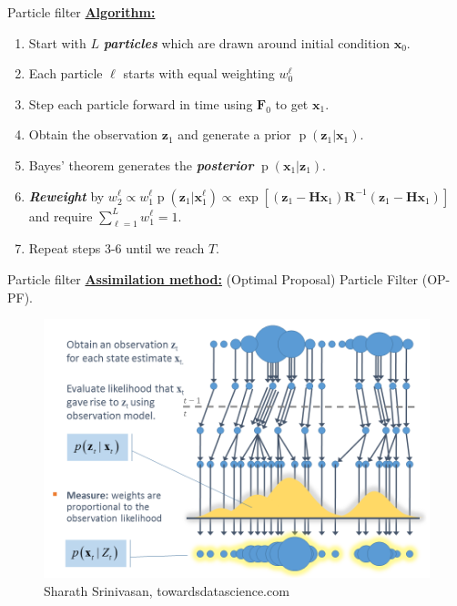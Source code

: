 \documentclass[aspectratio=169]{beamer}
\newcommand\boldgreen[1]{\textcolor{lighter_csu_green}{\emph{\textbf{#1}}}}
\newcommand{\state}{\boldsymbol{x}}
\newcommand{\observation}{\boldsymbol{z}}
\newcommand{\obsop}{\boldsymbol{H}}
\newcommand{\observationcovariance}{\boldsymbol{R}}
\newcommand{\modelf}{\boldsymbol{F}}
\newcommand{\prob}{\operatorname{p}}
\begin{document}

\begin{frame}{Particle filter}
\vfill
\textbf{\underline{Algorithm:}}
    \begin{enumerate}[1.]
    \pause
        \item Start with $L$ \boldgreen{particles} which are drawn around initial condition $\state_0$.
    \pause
        \item Each particle $\ell$ starts with equal weighting $w^\ell_0$
    \pause
        \item Step each particle forward in time using $\modelf_0$ to get $\state_1$. 
    \pause
        \item Obtain the observation $\observation_1$ and generate a prior $\prob(\observation_1 | \state_1)$.
    \pause
        \item Bayes' theorem generates the \boldgreen{posterior} $\prob(\state_1|\observation_1)$.
    \pause
        \item \boldgreen{Reweight} by $w^\ell_{2} \propto w_{1}^\ell \prob(\observation_1 | \state_1^\ell ) \propto \exp[(\observation_1 - \obsop \state_1) \observationcovariance^{-1} (\observation_1 - \obsop \state_1)]$ and require $\sum_{\ell = 1}^L w^\ell_{1} = 1.$
    \pause
        \item Repeat steps 3-6 until we reach $T$.
    \end{enumerate}
\vfill
\end{frame}



\begin{frame}{Particle filter}
    \textbf{\underline{Assimilation method:}} (Optimal Proposal) Particle Filter (OP-PF).
\begin{figure}[H]
    \centering
    \includegraphics[width=.65\textwidth]{figures/particle_filter_flowchart.png}
    \caption{Sharath Srinivasan, towardsdatascience.com}
\end{figure}
\vfill
\end{frame}
\end{document}
